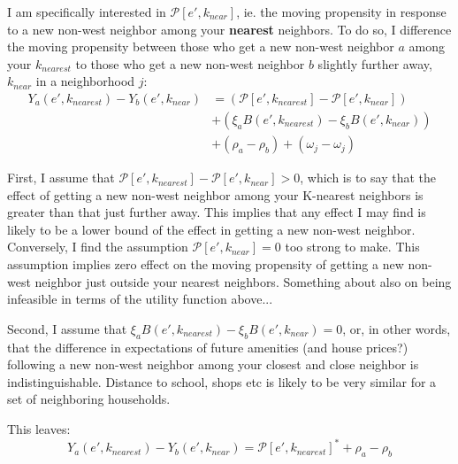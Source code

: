 \documentclass[../main.tex]{subfiles}
\begin{document}
I am specifically interested in $\mathcal{P}[e', k_{near}]$, ie. the moving propensity in response to a new non-west neighbor among your \textbf{nearest} neighbors. To do so, I difference the moving propensity between those who get a new non-west neighbor $a$ among your $k_{nearest}$ to those who get a new non-west neighbor $b$ slightly further away, $k_{near}$ in a neighborhood $j$:
\begin{equation}
\begin{split}
    Y_a(e', k_{nearest}) - Y_b(e', k_{near}) &=( \mathcal{P}[e', k_{nearest}] - \mathcal{P}[e', k_{near}]) \\
    &+ (\xi_a B(e', k_{nearest}) - \xi_b B(e', k_{near})) \\
    &+ (\rho_a - \rho_b)  + (\omega_j - \omega_j)
\end{split}
\label{eq:move_propensity_diff}
\end{equation}


First, I assume that $\mathcal{P}[e', k_{nearest}] - \mathcal{P}[e', k_{near}] > 0$, which is to say that the effect of getting a new non-west neighbor among your K-nearest neighbors is greater than that just further away. This implies that any effect I may find is likely to be a lower bound of the effect in getting a new non-west neighbor. Conversely, I find the assumption $\mathcal{P}[e', k_{near}] = 0$ too strong to make. This assumption implies zero effect on the moving propensity of getting a new non-west neighbor just outside your nearest neighbors. Something about also on being infeasible in terms of the utility function above...

Second, I assume that $\xi_a B(e', k_{nearest}) - \xi_b B(e', k_{near})=0$, or, in other words, that the difference in expectations of future amenities (and house prices?) following a new non-west neighbor among your closest and close neighbor is indistinguishable. Distance to school, shops etc is likely to be very similar for a set of neighboring households. 

This leaves:
\begin{equation}
    Y_a(e', k_{nearest}) - Y_b(e', k_{near}) = \mathcal{P}[e', k_{nearest}]^* + \rho_a - \rho_b
\end{equation}
\end{document}
